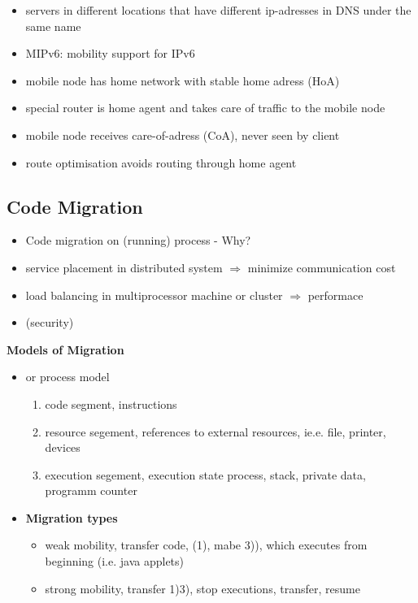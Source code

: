 \documentclass[ngerman,a4paper]{report}
\begin{document}
\begin{itemize}
	\item servers in different locations that have different ip-adresses in DNS under the same name
	\item MIPv6: mobility support for IPv6
	\item mobile node has home network with stable home adress (HoA)
	\item special router is home agent and takes care of traffic to the mobile node
	\item mobile node receives care-of-adress (CoA), never seen by client
	\item route optimisation avoids routing through home agent
\end{itemize}

\subsection{Code Migration}
\begin{itemize}
	\item Code migration on (running) process - Why?
	\item service placement in distributed system $\Rightarrow$ minimize communication cost
	\item load balancing in multiprocessor machine or cluster $\Rightarrow$ performace
	\item (security)

\end{itemize}

\textbf{Models of Migration}
\begin{itemize}
	\item or process model\begin{enumerate}
		\item code segment, instructions
		\item resource segement, references to external resources, ie.e. file, printer, devices
		\item execution segement, execution state process, stack, private data, programm counter

	\end{enumerate}
	\item \textbf{Migration types}\begin{itemize}
		\item weak mobility, transfer code, (1), mabe 3)), which executes from beginning (i.e. java applets)
		\item strong mobility, transfer 1)3), stop executions, transfer, resume
	\end{itemize}
\end{itemize}
\end{document}
